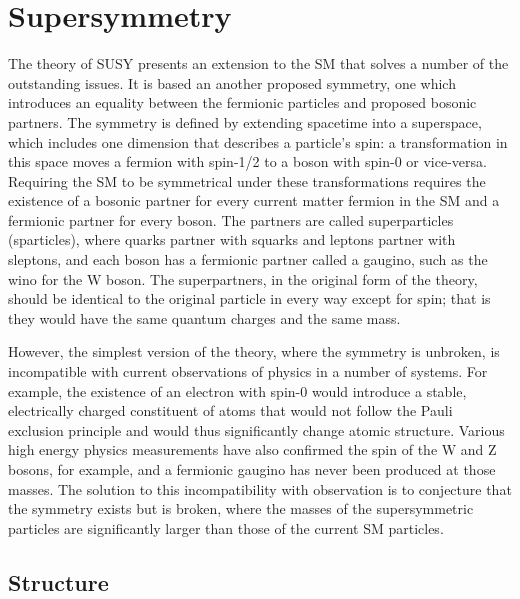 \chapter{Supersymmetry}

\label{ch:supersymmetry}

The theory of \ac{SUSY} presents an extension to the \ac{SM} that solves a number of the outstanding issues. 
It is based an another proposed symmetry, one which introduces an equality between the fermionic particles and proposed bosonic partners.
The symmetry is defined by extending spacetime into a superspace, which includes one dimension that describes a particle's spin: a transformation in this space moves a fermion with spin-1/2 to a boson with spin-0 or vice-versa.
Requiring the \ac{SM} to be symmetrical under these transformations requires the existence of a bosonic partner for every current matter fermion in the \ac{SM} and a fermionic partner for every boson. 
The partners are called superparticles (sparticles), where quarks partner with squarks and leptons partner with sleptons, and each boson has a fermionic partner called a gaugino, such as the wino for the W boson.
The superpartners, in the original form of the theory, should be identical to the original particle in every way except for spin; that is they would have the same quantum charges and the same mass.

However, the simplest version of the theory, where the symmetry is unbroken, is incompatible with current observations of physics in a number of systems.
For example, the existence of an electron with spin-0 would introduce a stable, electrically charged constituent of atoms that would not follow the Pauli exclusion principle and would thus significantly change atomic structure.
Various high energy physics measurements have also confirmed the spin of the W and Z bosons, for example, and a fermionic gaugino has never been produced at those masses.
The solution to this incompatibility with observation is to conjecture that the symmetry exists but is broken, where the masses of the supersymmetric particles are significantly larger than those of the current \ac{SM} particles. 


\section{Structure}
\label{sec:mssm}

